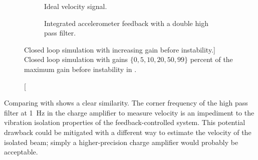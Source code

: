\documentclass[11pt,a4paper]{memoir}
\begin{document}
\begin{figure}[!htbp]
  \begin{wide}
  \begin{subfigure}
    \caption{Ideal velocity signal.}
  \end{subfigure}
  \begin{subfigure}
    \caption{Integrated accelerometer feedback with a double high pass filter.}
  \end{subfigure}
  \end{wide}
  \caption
  [Closed loop simulation with increasing gain before instability.]
  {Closed loop simulation with gains $\{0, 5, 10, 20, 50, 99\}$ percent of the maximum gain before instability in .}
\end{figure}

Comparing  with  shows a clear
similarity. The corner frequency of the high pass filter at \SI{1}{Hz} in the
charge amplifier to measure velocity is an impediment to the vibration
isolation properties of the feedback-controlled system. This potential
drawback could be mitigated with a different way to estimate the velocity of
the isolated beam; simply a higher-precision charge amplifier would probably
be acceptable.
\end{document}
